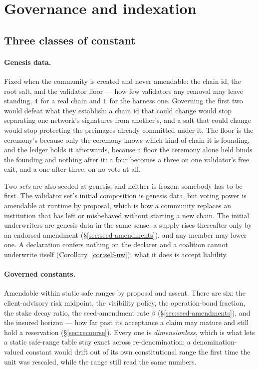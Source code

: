 \section{Governance and indexation}
\label{sec:governance}

\subsection{Three classes of constant}

\paragraph{Genesis data.} Fixed when the community is created and never amendable: the
chain id, the root salt, and the validator floor --- how few validators any removal may
leave standing, $4$ for a real chain and $1$
for the harness one. Governing the first two would defeat what they establish: a chain id
that could change would stop separating one network's signatures from another's, and a
salt that could change would stop protecting the preimages already committed under it.
The floor is the ceremony's because only the ceremony knows which kind of chain it is
founding, and the ledger holds it afterwards, because a floor the ceremony alone held
binds the founding and nothing after it: a four becomes a three on one validator's free
exit, and a one after three, on no vote at all.

Two \emph{sets} are also seeded at genesis, and neither is frozen: somebody has to be
first. The validator set's initial composition is genesis data, but voting power is
amendable at runtime by proposal, which is how a community replaces an institution that
has left or misbehaved without starting a new chain. The initial underwriters are genesis
data in the same sense: a supply rises thereafter only by an endorsed amendment
(\S\ref{sec:seed-amendments}), and any member may lower one. A declaration confers
nothing on the declarer and a coalition cannot underwrite itself
(Corollary~\ref{cor:self-uw}); what it does is accept liability.

\paragraph{Governed constants.} Amendable within static safe ranges by proposal and
assent. There are six: the client-advisory risk midpoint, the visibility policy, the
operation-bond fraction, the stake decay ratio, the seed-amendment rate $\beta$
(\S\ref{sec:seed-amendments}), and the insured horizon --- how far past its acceptance a
claim may mature and still hold a reservation (\S\ref{sec:recourse}). Every one is
\emph{dimensionless}, which is what lets a static safe-range table stay exact across
re-denomination: a denomination-valued constant would drift out of its own constitutional
range the first time the unit was rescaled, while the range still read the same numbers.

